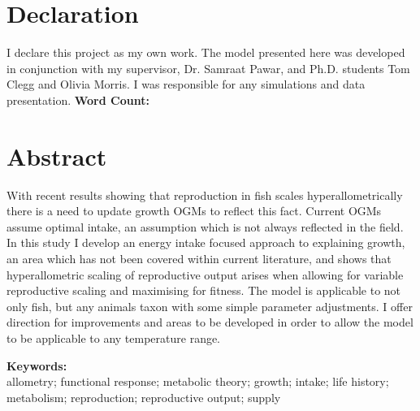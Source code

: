 \documentclass[a4paper, 11pt, hidelinks]{article} %
\newcommand\wordcount{} %
\begin{document}
	
	

	\section*{Declaration}
	I declare this project as my own work.  The model presented here was developed in conjunction with my supervisor, Dr. Samraat Pawar, and Ph.D. students Tom Clegg and Olivia Morris.  I was responsible for any simulations and data presentation.\newline
	\textbf{Word Count: \wordcount}

	\newpage
	
	\section*{Abstract}
	\linenumbers
	 
	With recent results showing that reproduction in fish scales hyperallometrically there is a need to update growth OGMs to reflect this fact.  Current OGMs assume optimal intake, an assumption which is not always reflected in the field.  In this study I develop an energy intake focused approach to explaining growth, an area which has not been covered within current literature, and shows that hyperallometric scaling of reproductive output arises when allowing for variable reproductive scaling and maximising for fitness.  The model is applicable to not only fish, but any animals taxon with some simple parameter adjustments.  I offer direction for improvements and areas to be developed in order to allow the model to be applicable to any temperature range.
	\vspace*{0.5 cm}
	\newline
%	

	\textbf{Keywords:}\\
	allometry; functional response; metabolic theory; growth; intake; life history; metabolism; reproduction; reproductive output; supply

	
	
	\nolinenumbers
	
\end{document}
